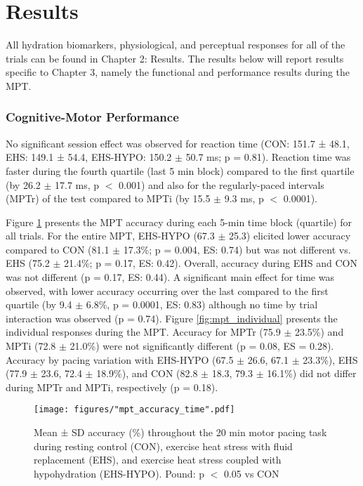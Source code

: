 \section{Results}
All hydration biomarkers, physiological, and perceptual responses for all of the trials can be found in Chapter 2: Results. The results below will report results specific to Chapter 3, namely the functional and performance results during the MPT.

\subsubsection{Cognitive-Motor Performance}
No significant session effect was observed for reaction time (CON: 151.7 ± 48.1, EHS: 149.1 ± 54.4, EHS-HYPO: 150.2 ${\pm}$ 50.7 ms; p = 0.81). Reaction time was faster during the fourth quartile (last 5 min block) compared to the first quartile (by 26.2 ${\pm}$ 17.7 ms, p ${<}$ 0.001) and also for the regularly-paced intervals (MPTr) of the test compared to MPTi (by 15.5 ${\pm}$ 9.3 ms, p ${<}$ 0.0001).    

Figure \ref{fig:mpt_accuracy_time} presents the MPT accuracy during each 5-min time block (quartile) for all trials. For the entire MPT, EHS-HYPO (67.3 ${\pm}$ 25.3) elicited lower accuracy compared to CON (81.1 ${\pm}$ 17.3\%; p = 0.004, ES: 0.74) but was not different vs. EHS (75.2 ${\pm}$ 21.4\%; p = 0.17, ES: 0.42). Overall, accuracy during EHS and CON was not different (p = 0.17, ES: 0.44). A significant main effect for time was observed, with lower accuracy occurring over the last compared to the first quartile (by 9.4 ${\pm}$ 6.8\%, p = 0.0001, ES: 0.83) although no time by trial interaction was observed (p = 0.74). Figure \ref{fig:mpt_individual} presents the individual responses during the MPT. Accuracy for MPTr (75.9 ${\pm}$ 23.5\%) and MPTi (72.8 ${\pm}$ 21.0\%) were not significantly different (p = 0.08, ES = 0.28). Accuracy by pacing variation with EHS-HYPO (67.5 ${\pm}$ 26.6, 67.1 ${\pm}$ 23.3\%), EHS (77.9 ${\pm}$ 23.6, 72.4 ${\pm}$ 18.9\%), and CON (82.8 ${\pm}$ 18.3, 79.3 ${\pm}$ 16.1\%) did not differ during MPTr and MPTi, respectively (p = 0.18).  

\begin{figure}
	\centering
	\texttt{[image: figures/"mpt\_accuracy\_time".pdf]}
	\caption{Mean ± SD accuracy (\%) throughout the 20 min motor pacing task during resting control (CON), exercise heat stress with fluid replacement (EHS), and exercise heat stress coupled with hypohydration (EHS-HYPO). Pound: p ${<}$ 0.05 vs CON}
	\label{fig:mpt_accuracy_time}	
\end{figure}

